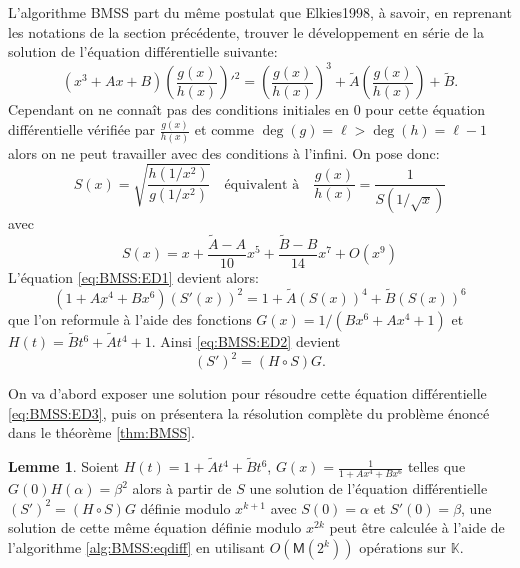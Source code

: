 \documentclass[10pt,a4paper]{book}
\theoremstyle{plain}
\theoremstyle{definition}
\newtheorem{lem}[thm]{Lemme}
\theoremstyle{definition}
\theoremstyle{definition}
\theoremstyle{definition}
\theoremstyle{remark}
\theoremstyle{remark}
\theoremstyle{definition}
\begin{document}
L'algorithme BMSS part du même postulat que Elkies1998, à savoir, en reprenant les notations de la section précédente, trouver le développement en série de la solution de l'équation différentielle suivante:   
\begin{equation}
\label{eq:BMSS:ED1}
(x^3+Ax+B)\left(\frac{g(x)}{h(x)} \right)'^2=  \left(\frac{g(x)}{h(x)} \right)^3 + \tilde{A} \left(\frac{g(x)}{h(x)} \right) + \tilde{B}.
\end{equation}
Cependant on ne connaît pas des conditions initiales en $0$ pour cette équation différentielle vérifiée par $\frac{g(x)}{h(x)}$ et comme $\deg(g)=\ell> \deg(h)= \ell-1$ alors on ne peut travailler avec des conditions à l'infini. On pose donc:
\begin{equation}
S(x)=\sqrt{\frac{h(1/x^2)}{g(1/x^2)}} \quad \text{équivalent à} \quad \frac{g(x)}{h(x)}=\frac{1}{S(1/\sqrt{x})}
\end{equation} 
avec 
\begin{equation}
S(x)=x + \frac{\tilde{A}-A}{10}x^5+\frac{\tilde{B}-B}{14}x^7+O(x^9)
\end{equation}
L'équation \eqref{eq:BMSS:ED1} devient alors:
\begin{equation}
\label{eq:BMSS:ED2}
(1+Ax^4+Bx^6)(S'(x))^2=1+\tilde{A}(S(x))^4+\tilde{B}(S(x))^6
\end{equation}
que l'on reformule à l'aide des fonctions $G(x)=1/(Bx^6+Ax^4+1)$ et $H(t)=\tilde{B}t^6+\tilde{A}t^4+1$. Ainsi \eqref{eq:BMSS:ED2} devient 
\begin{equation}
\label{eq:BMSS:ED3}
(S')^2=(H \circ S) G.
\end{equation}

On va d'abord exposer une solution pour résoudre cette équation différentielle \eqref{eq:BMSS:ED3}, puis on présentera la résolution complète du problème énoncé dans le théorème \ref{thm:BMSS}. 

\begin{lem}
\label{lem:BMSS}
Soient $H(t)=1+\tilde{A}t^4+\tilde{B}t^6$, $G(x)=\frac{1}{1+Ax^4+Bx^6}$ telles que $G(0)H(\alpha)=\beta^2$ alors à partir de $S$ une solution de l'équation différentielle $(S')^2=(H \circ S) G$ définie modulo $x^{k+1}$ avec $S(0)=\alpha$ et $S'(0)=\beta$, une solution de cette même équation définie modulo $x^{2k}$ peut être calculée à l'aide de l'algorithme \ref{alg:BMSS:eqdiff} en utilisant $O(\mathsf{M}(2^k))$ opérations sur $\mathbb{K}$.
\end{lem}
\end{document}
